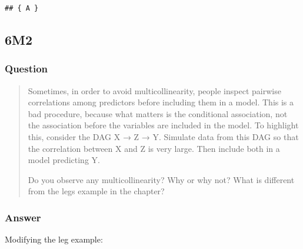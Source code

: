 \documentclass[
]{book}
\begin{document}
\begin{verbatim}
## { A }
\end{verbatim}

\hypertarget{m2-3}{%
\subsection*{6M2}\label{m2-3}}

\hypertarget{question-53}{%
\subsubsection*{Question}\label{question-53}}

\begin{quote}
Sometimes, in order to avoid multicollinearity, people inspect pairwise correlations among predictors before including them in a model. This is a bad procedure, because what matters is the conditional association, not the association before the variables are included in the model. To highlight this, consider the DAG X → Z → Y. Simulate data from this DAG so that the correlation between X and Z is very large. Then include both in a model predicting Y.

Do you observe any multicollinearity? Why or why not? What is different from the legs example in the chapter?
\end{quote}

\hypertarget{answer-53}{%
\subsubsection*{Answer}\label{answer-53}}

Modifying the leg example:
\end{document}
